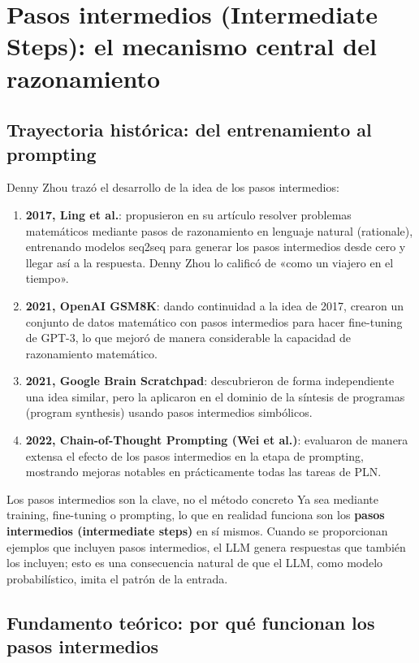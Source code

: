 \section{Pasos intermedios (Intermediate Steps): el mecanismo central del razonamiento}

\subsection{Trayectoria histórica: del entrenamiento al prompting}

Denny Zhou trazó el desarrollo de la idea de los pasos intermedios:

\begin{enumerate}
    \item \textbf{2017, Ling et al.}: propusieron en su artículo resolver problemas matemáticos mediante pasos de razonamiento en lenguaje natural (rationale), entrenando modelos seq2seq para generar los pasos intermedios desde cero y llegar así a la respuesta. Denny Zhou lo calificó de «como un viajero en el tiempo».
    \item \textbf{2021, OpenAI GSM8K}: dando continuidad a la idea de 2017, crearon un conjunto de datos matemático con pasos intermedios para hacer fine-tuning de GPT-3, lo que mejoró de manera considerable la capacidad de razonamiento matemático.
    \item \textbf{2021, Google Brain Scratchpad}: descubrieron de forma independiente una idea similar, pero la aplicaron en el dominio de la síntesis de programas (program synthesis) usando pasos intermedios simbólicos.
    \item \textbf{2022, Chain-of-Thought Prompting (Wei et al.)}: evaluaron de manera extensa el efecto de los pasos intermedios en la etapa de prompting, mostrando mejoras notables en prácticamente todas las tareas de PLN.
\end{enumerate}

\begin{importantbox}{Los pasos intermedios son la clave, no el método concreto}
Ya sea mediante training, fine-tuning o prompting, lo que en realidad funciona son los \textbf{pasos intermedios (intermediate steps)} en sí mismos. Cuando se proporcionan ejemplos que incluyen pasos intermedios, el LLM genera respuestas que también los incluyen; esto es una consecuencia natural de que el LLM, como modelo probabilístico, imita el patrón de la entrada.
\end{importantbox}

\subsection{Fundamento teórico: por qué funcionan los pasos intermedios}


